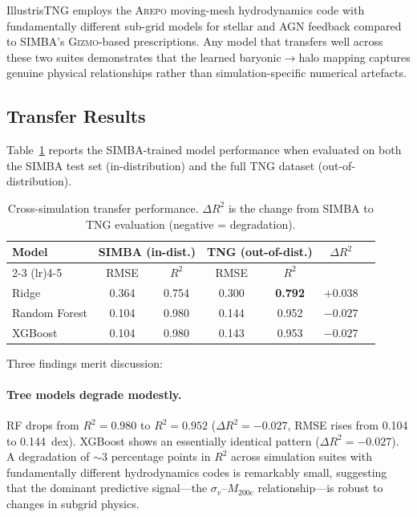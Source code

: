 \documentclass[12pt, a4paper]{article}
\newcommand{\Mhalo}{M_{200\mathrm{c}}}
\newcommand{\sigmav}{\sigma_v}
\begin{document}
IllustrisTNG employs the \textsc{Arepo} moving-mesh hydrodynamics code with fundamentally different sub-grid models for stellar and AGN feedback compared to SIMBA's \textsc{Gizmo}-based prescriptions.  Any model that transfers well across these two suites demonstrates that the learned baryonic$\rightarrow$halo mapping captures genuine physical relationships rather than simulation-specific numerical artefacts.


\subsection{Transfer Results}
\label{sec:transfer_results}

Table~\ref{tab:transfer} reports the SIMBA-trained model performance when evaluated on both the SIMBA test set (in-distribution) and the full TNG dataset (out-of-distribution).

\begin{table}[H]
  \centering
  \caption{Cross-simulation transfer performance.  $\Delta R^2$ is the change from SIMBA to TNG evaluation (negative = degradation).}
  \label{tab:transfer}
  \begin{tabular}{@{}lcccccc@{}}
    \toprule
    Model & \multicolumn{2}{c}{SIMBA (in-dist.)} & \multicolumn{2}{c}{TNG (out-of-dist.)} & $\Delta R^2$ \\
    \cmidrule(lr){2-3} \cmidrule(lr){4-5}
          & RMSE & $R^2$ & RMSE & $R^2$ & \\
    \midrule
    Ridge       & 0.364 & 0.754 & 0.300 & \textbf{0.792} & $+0.038$ \\
    Random Forest & 0.104 & 0.980 & 0.144 & 0.952 & $-0.027$ \\
    XGBoost     & 0.104 & 0.980 & 0.143 & 0.953 & $-0.027$ \\
    \bottomrule
  \end{tabular}
\end{table}

Three findings merit discussion:

\paragraph{Tree models degrade modestly.}
RF drops from $R^2 = 0.980$ to $R^2 = 0.952$ ($\Delta R^2 = -0.027$, RMSE rises from 0.104 to 0.144~dex).  XGBoost shows an essentially identical pattern ($\Delta R^2 = -0.027$).  A degradation of $\sim$3 percentage points in $R^2$ across simulation suites with fundamentally different hydrodynamics codes is remarkably small, suggesting that the dominant predictive signal---the $\sigmav$--$\Mhalo$ relationship---is robust to changes in subgrid physics.
\end{document}
